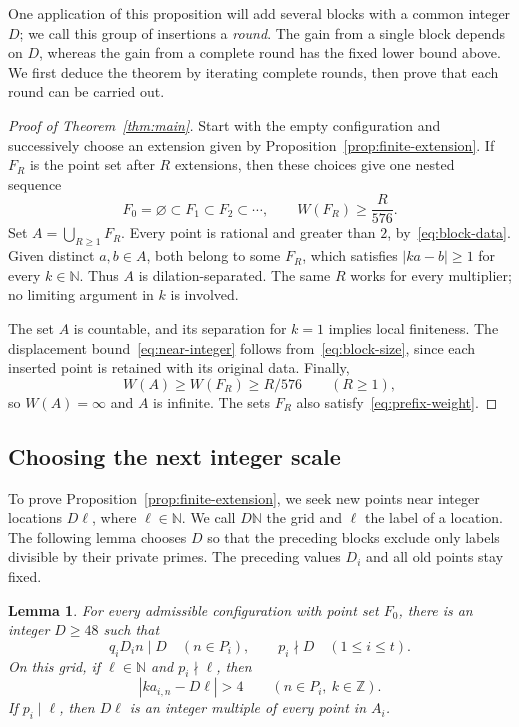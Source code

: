 \documentclass[11pt,reqno]{amsart}
\newtheorem{lemma}[theorem]{Lemma}
\theoremstyle{definition}
\theoremstyle{remark}
\numberwithin{equation}{section}
\newcommand{\N}{\mathbb N}
\newcommand{\Z}{\mathbb Z}
\begin{document}
One application of this proposition will add several blocks with a
common integer $D$; we call this group of insertions a \emph{round}.
The gain from a single block depends on $D$, whereas the gain from a
complete round has the fixed lower bound above. We first deduce the
theorem by iterating complete rounds, then prove that each round can
be carried out.

\begin{proof}[Proof of Theorem~\ref{thm:main}]
Start with the empty configuration and successively choose an extension
given by Proposition~\ref{prop:finite-extension}. If $F_R$ is the point
set after $R$ extensions, then these choices give one nested sequence
\[
 F_0=\varnothing\subset F_1\subset F_2\subset\cdots,
 \qquad W(F_R)\geq\frac R{576}.
\]
Set $A=\bigcup_{R\geq1}F_R$. Every point is rational and greater than
$2$, by~\eqref{eq:block-data}. Given distinct $a,b\in A$, both belong
to some $F_R$, which satisfies $|ka-b|\geq1$ for every $k\in\N$.
Thus $A$ is dilation-separated. The same $R$ works for every multiplier;
no limiting argument in $k$ is involved.

The set $A$ is countable, and its separation for $k=1$ implies local
finiteness. The displacement bound~\eqref{eq:near-integer} follows
from~\eqref{eq:block-size}, since each inserted point is retained with
its original data. Finally,
\[
 W(A)\geq W(F_R)\geq R/576\qquad(R\geq1),
\]
so $W(A)=\infty$ and $A$ is infinite. The sets $F_R$ also
satisfy~\eqref{eq:prefix-weight}.
\end{proof}

\subsection{Choosing the next integer scale}

To prove Proposition~\ref{prop:finite-extension}, we seek new points
near integer locations $D\ell$, where $\ell\in\N$. We call $D\N$
the grid and $\ell$ the label of a location. The following lemma chooses
$D$ so that the preceding blocks exclude only labels divisible by their
private primes. The preceding values $D_i$ and all old points stay fixed.

\begin{lemma}\label{lem:grid}
For every admissible configuration with point set $F_0$, there is an
integer $D\geq48$ such that
\begin{equation}\label{eq:grid-choice}
 q_iD_i n\mid D\quad(n\in P_i),
 \qquad p_i\nmid D\quad(1\leq i\leq t).
\end{equation}
On this grid, if $\ell\in\N$ and $p_i\nmid\ell$, then
\begin{equation}\label{eq:grid-separation}
 |ka_{i,n}-D\ell|>4
 \qquad(n\in P_i,\ k\in\Z).
\end{equation}
If $p_i\mid\ell$, then $D\ell$ is an integer multiple of every point
in $A_i$.
\end{lemma}
\end{document}
